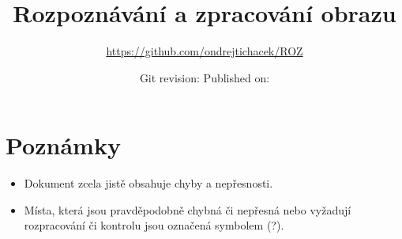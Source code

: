 \documentclass[11pt,a4paper]{article}
\author{\url{https://github.com/ondrejtichacek/ROZ}}
\date{Git revision: \gitAbbrevHash{} \hfill Published on: \gitAuthorDate{}}
\title{Rozpoznávání a zpracování obrazu}
\begin{document}
\maketitle

\tableofcontents

\section*{Poznámky}
\begin{itemize}
	\item Dokument zcela jistě obsahuje chyby a nepřesnosti.
	\item Místa, která jsou pravděpodobně chybná či nepřesná nebo vyžadují rozpracování či kontrolu jsou označená symbolem (?).
\end{itemize}

\clearpage


\end{document}
